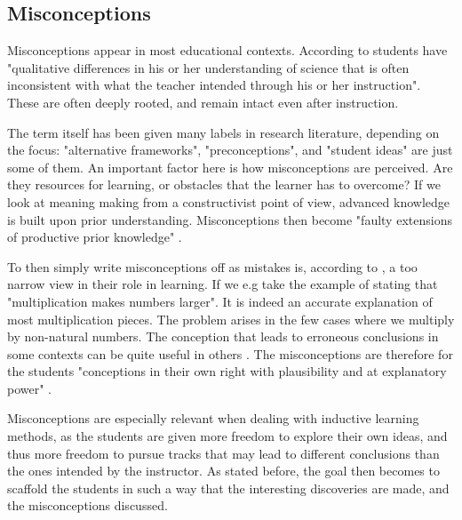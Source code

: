 \subsection{Misconceptions}
Misconceptions appear in most educational contexts. According to \citet{gomez2008elementary} students have "qualitative differences in his or her understanding of science that is often inconsistent with what the teacher intended through his or her instruction". These are often deeply rooted, and remain intact even after instruction. 

The term itself has been given many labels in research literature, depending on the focus: "alternative frameworks", "preconceptions", and "student ideas" are just some of them. An important factor here is how misconceptions are perceived. Are they resources for learning, or obstacles that the learner has to overcome? If we look at meaning making from a constructivist point of view, advanced knowledge is built upon prior understanding. Misconceptions then become "faulty extensions of productive prior knowledge" \citep{smith1994misconceptions}.

To then simply write misconceptions off as mistakes is, according to \citet{smith1994misconceptions}, a too narrow view in their role in learning. If we e.g take the example of stating that "multiplication makes numbers larger". It is indeed an accurate explanation of most multiplication pieces. The problem arises in the few cases where we multiply by non-natural numbers. The conception that leads to erroneous conclusions in some contexts can be quite useful in others \citep{smith1994misconceptions}. The misconceptions are therefore for the students "conceptions in their own right with plausibility and at explanatory power" \citetext{Smith, diSessa \& Roschelle 1993, referenced in \citealp{larkin2012misconceptions}}. 

Misconceptions are especially relevant when dealing with inductive learning methods, as the students are given more freedom to explore their own ideas, and thus more freedom to pursue tracks that may lead to different conclusions than the ones intended by the instructor. As stated before, the goal then becomes to scaffold the students in such a way that the interesting discoveries are made, and the misconceptions discussed. 


